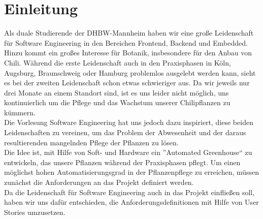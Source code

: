 \section{Einleitung}
Als duale Studierende der DHBW-Mannheim haben wir eine große Leidenschaft für Software Engineering in den Bereichen Frontend, Backend und Embedded.
Hinzu kommt ein großes Interesse für Botanik, insbesondere für den Anbau von Chili. 
Während die erste Leidenschaft auch in den Praxisphasen in Köln, Augsburg, Braunschweig oder Hamburg problemlos ausgelebt werden kann, 
sieht es bei der zweiten Leidenschaft schon etwas schwieriger aus. 
Da wir jeweils nur drei Monate an einem Standort sind, ist es uns leider nicht möglich, uns kontinuierlich um die Pflege und das Wachstum unserer Chilipflanzen zu kümmern. 
\\
Die Vorlesung Software Engineering hat uns jedoch dazu inspiriert, diese beiden Leidenschaften zu vereinen, um das Problem der Abwesenheit und der daraus resultierenden mangelnden Pflege der Pflanzen zu lösen. 
\\
Die Idee ist, mit Hilfe von Soft- und Hardware ein ''Automated Greenhouse`` zu entwickeln, das unsere Pflanzen während der Praxisphasen pflegt. Um einen möglichst hohen Automatisierungsgrad in der Pflanzenpflege zu erreichen, müssen zunächst die Anforderungen an das Projekt definiert werden.
\\
Da die Leidenschaft für Software Engineering auch in das Projekt einfließen soll, haben wir uns dafür entschieden, die Anforderungsdefinitionen mit Hilfe von User Stories umzusetzen.
\\
